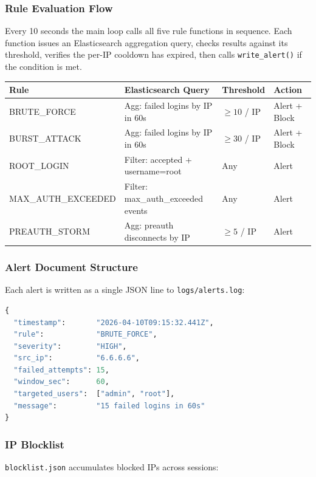 \documentclass[12pt,a4paper]{article}
\newcommand{\file}[1]{\texttt{\color{accent}#1}}
\begin{document}
\subsubsection*{Rule Evaluation Flow}
Every 10 seconds the main loop calls all five rule functions in sequence.
Each function issues an Elasticsearch aggregation query, checks results
against its threshold, verifies the per-IP cooldown has expired, then
calls \texttt{write\_alert()} if the condition is met.

\begin{center}
\begin{tabular}{p{3.8cm}p{5.5cm}p{2.2cm}p{2cm}}
  \toprule
  \textbf{Rule} & \textbf{Elasticsearch Query} & \textbf{Threshold} & \textbf{Action} \\
  \midrule
  BRUTE\_FORCE       & Agg: failed logins by IP in 60s    & $\geq 10$ / IP & Alert + Block \\
  BURST\_ATTACK      & Agg: failed logins by IP in 60s    & $\geq 30$ / IP & Alert + Block \\
  ROOT\_LOGIN        & Filter: accepted + username=root   & Any            & Alert \\
  MAX\_AUTH\_EXCEEDED & Filter: max\_auth\_exceeded events & Any            & Alert \\
  PREAUTH\_STORM     & Agg: preauth disconnects by IP     & $\geq 5$ / IP  & Alert \\
  \bottomrule
\end{tabular}
\end{center}

\subsubsection*{Alert Document Structure}
Each alert is written as a single JSON line to \file{logs/alerts.log}:

\begin{lstlisting}[language=Python, caption=Sample alert document]
{
  "timestamp":       "2026-04-10T09:15:32.441Z",
  "rule":            "BRUTE_FORCE",
  "severity":        "HIGH",
  "src_ip":          "6.6.6.6",
  "failed_attempts": 15,
  "window_sec":      60,
  "targeted_users":  ["admin", "root"],
  "message":         "15 failed logins in 60s"
}
\end{lstlisting}

\subsubsection*{IP Blocklist}
\file{blocklist.json} accumulates blocked IPs across sessions:
\end{document}
